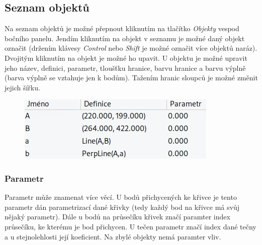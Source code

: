 \documentclass[11pt]{article}
\begin{document}
    \subsection{Seznam objektů}
    Na seznam objektů je možné přepnout kliknutím na tlačítko \textit{Objekty} vespod bočního panelu. Jendím kliknutím na objekt v seznamu je možné daný objekt označit (držením klávesy \textit{Control} nebo \textit{Shift} je možné označit více objektů naráz). Dvojitým kliknutím na objekt je možné ho upavit. U objektu je možné upravit jeho název, definici, parametr, tloušťku hranice, barvu hranice a barvu výplně (barva výplně se vztahuje jen k bodům). Tažením hranic sloupců je možné změnit jejich šířku.
    \begin{figure}[h]
        \begin{center}
        \includegraphics[scale=0.5]{imgs/obj_list.png}
        \end{center}
    \end{figure}
    \vspace{-20pt}
    \subsubsection{Parametr}
    Parametr může znamenat více věcí. U bodů přichycených ke křivce je tento parametr dán parametrizací dané křivky (tedy každý bod na křivce má svůj nějaký parametr). Dále u bodů na průsečíku křivek značí paramter index průsečíku, ke kterému je bod přichycen. U tečen parametr značí index dané tečny a u stejnolehlosti její koeficient. Na zbylé objekty nemá paramter vliv.
\end{document}
